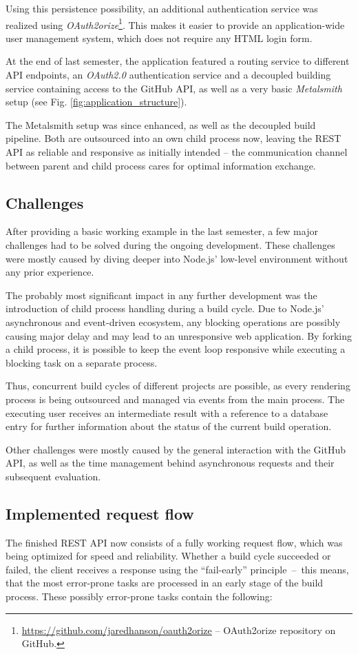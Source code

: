 \documentclass[a4paper,english,11pt]{report}
\begin{document}
Using this persistence possibility, an additional authentication service was realized using \emph{OAuth2orize}\footnote{\url{https://github.com/jaredhanson/oauth2orize} -- OAuth2orize repository on GitHub.}. This makes it easier to provide an application-wide user management system, which does not require any HTML login form.

At the end of last semester, the application featured a routing service to different API endpoints, an \emph{OAuth2.0} authentication service and a decoupled building service containing access to the GitHub API, as well as a very basic \emph{Metalsmith} setup (see Fig. \ref{fig:application_structure}).

The Metalsmith setup was since enhanced, as well as the decoupled build pipeline. Both are outsourced into an own child process now, leaving the REST API as reliable and responsive as initially intended -- the communication channel between parent and child process cares for optimal information exchange.

\subsection{Challenges}
After providing a basic working example in the last semester, a few major challenges had to be solved during the ongoing development. These challenges were mostly caused by diving deeper into Node.js' low-level environment without any prior experience.

The probably most significant impact in any further development was the introduction of child process handling during a build cycle. Due to Node.js' asynchronous and event-driven ecosystem, any blocking operations are possibly causing major delay and may lead to an unresponsive web application. By forking a child process, it is possible to keep the event loop responsive while executing a blocking task on a separate process.

Thus, concurrent build cycles of different projects are possible, as every rendering process is being outsourced and managed via events from the main process. The executing user receives an intermediate result with a reference to a database entry for further information about the status of the current build operation.

Other challenges were mostly caused by the general interaction with the GitHub API, as well as the time management behind asynchronous requests and their subsequent evaluation.

\subsection{Implemented request flow}
The finished REST API now consists of a fully working request flow, which was being optimized for speed and reliability. Whether a build cycle succeeded or failed, the client receives a response using the ``fail-early'' principle~--~this means, that the most error-prone tasks are processed in an early stage of the build process. These possibly error-prone tasks contain the following:
\end{document}
